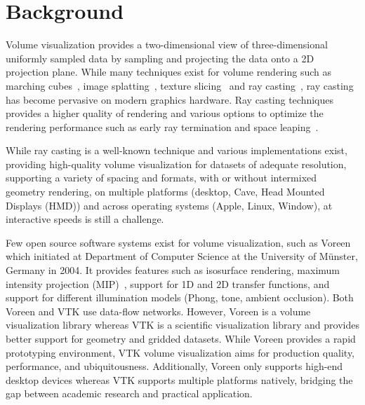 \section{Background}
\label{relatedwork}

Volume visualization provides a two-dimensional view of three-dimensional
uniformly sampled data by sampling and projecting the data onto a 2D
projection plane.  While many techniques exist for volume rendering such as
marching cubes~\citep{lorensen_marching_1987}, image
splatting~\citep{westover_footprint_1990}, texture
slicing~\citep{rezk-salama_interactive_2000, engel_high-quality_2001} and ray
casting~\citep{hsu_segmented_1993, ma_parallel_1995, ma_scalable_1997,
heng_gpu-based_2005}, ray casting has become pervasive on modern graphics
hardware. Ray casting techniques provides a higher quality of rendering and
various options to optimize the rendering performance such as early ray
termination and space leaping~\citep{yagel_accelerating_1993}.

While ray casting is a well-known technique and various implementations exist,
providing high-quality volume visualization for datasets of adequate
resolution, supporting a variety of spacing and formats, with or without
intermixed geometry rendering, on multiple platforms (desktop, Cave, Head
Mounted Displays (HMD)) and across operating systems (Apple, Linux, Window), at
interactive speeds is still a challenge.

Few open source software systems exist for volume visualization, such as
Voreen~\citep{meyer-spradow_voreen:_2009} which initiated at Department of
Computer Science at the University of M\"unster, Germany in 2004.  It provides
features such as isosurface rendering, maximum intensity projection
(MIP)~\citep{wallis_three-dimensional_1989}, support for 1D and 2D transfer
functions, and support for different illumination models (Phong, tone, ambient
occlusion). Both Voreen and VTK use data-flow networks. However, Voreen is a
volume visualization library whereas VTK is a scientific visualization library
and provides better support for geometry and gridded datasets. While Voreen
provides a rapid prototyping environment, VTK volume visualization aims for
production quality, performance, and ubiquitousness. Additionally, Voreen only
supports high-end desktop devices whereas VTK supports multiple platforms
natively, bridging the gap between academic research and practical application.

